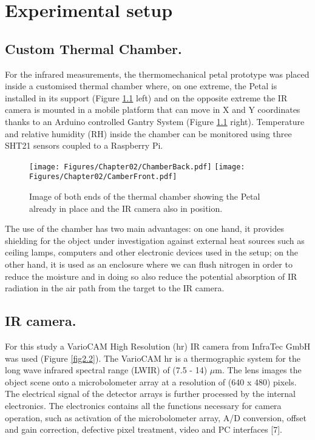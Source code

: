 \pagestyle{standard}

\chapter{Experimental setup}\label{chapter2}

	\thispagestyle{chapter-first-page}
	
	\section{Custom Thermal Chamber.}\label{section2.1}
	
		For the infrared measurements, the thermomechanical petal prototype was placed inside a customised thermal chamber where, on one extreme, the Petal is installed in its support (Figure \ref{fig2.1} left) and on the opposite extreme the IR camera is mounted in a mobile platform that can move in X and Y coordinates thanks to an Arduino controlled Gantry System (Figure \ref{fig2.1} right). Temperature and relative humidity (RH) inside the chamber can be monitored using three SHT21 sensors coupled to a Raspberry Pi.
		
		\begin{figure}[ht!]
			\centering
			\captionsetup{justification=centering,margin=2cm}
			\texttt{[image: Figures/Chapter02/ChamberBack.pdf]}
			\texttt{[image: Figures/Chapter02/CamberFront.pdf]}
			\caption{Image of both ends of the thermal chamber showing the Petal already in place and the IR camera also in position.}\label{fig2.1}
		\end{figure}
		
		The use of the chamber has two main advantages: on one hand, it provides shielding for the object under investigation against external heat sources such as ceiling lamps, computers and other electronic devices used in the setup; on the other hand, it is used as an enclosure where we can flush nitrogen in order to reduce the moisture and in doing so also reduce the potential absorption of IR radiation in the air path from the target to the IR camera.
		
	\section{IR camera.}\label{section2.2}
	
		For this study a VarioCAM High Resolution (hr) IR camera from InfraTec GmbH was used (Figure \ref{fig2.2}). The VarioCAM \textregistered\space hr is a thermographic system for the long wave infrared spectral range (LWIR) of (7.5 - 14) $\mu$m. The lens images the object scene onto a microbolometer array at a resolution of (640 x 480) pixels. The electrical signal of the detector arrays is further processed by the internal electronics. The electronics contains all the functions necessary for camera operation, such as activation of the microbolometer array, A/D conversion, offset and gain correction, defective pixel treatment, video and PC interfaces [7].
		
